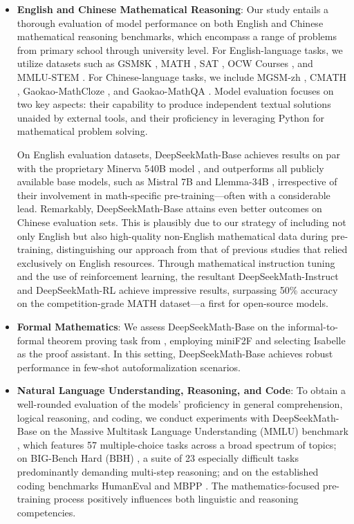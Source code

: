 \begin{itemize}[topsep=0pt]
    \item \textbf{English and Chinese Mathematical Reasoning}: Our study entails a thorough evaluation of model performance on both English and Chinese mathematical reasoning benchmarks, which encompass a range of problems from primary school through university level. For English-language tasks, we utilize datasets such as GSM8K \citep{gsm8k}, MATH \citep{MATH}, SAT \citep{llemma}, OCW Courses \citep{minerva}, and MMLU-STEM \citep{mmlu}. For Chinese-language tasks, we include MGSM-zh \citep{mgsm}, CMATH \citep{wei2023cmath}, Gaokao-MathCloze \citep{agieval}, and Gaokao-MathQA \citep{agieval}. Model evaluation focuses on two key aspects: their capability to produce independent textual solutions unaided by external tools, and their proficiency in leveraging Python for mathematical problem solving.

On English evaluation datasets, DeepSeekMath-Base achieves results on par with the proprietary Minerva 540B model \citep{minerva}, and outperforms all publicly available base models, such as Mistral 7B \citep{mistral} and Llemma-34B \citep{llemma}, irrespective of their involvement in math-specific pre-training—often with a considerable lead. Remarkably, DeepSeekMath-Base attains even better outcomes on Chinese evaluation sets. This is plausibly due to our strategy of including not only English but also high-quality non-English mathematical data during pre-training, distinguishing our approach from that of previous studies \citep{minerva,llemma} that relied exclusively on English resources. Through mathematical instruction tuning and the use of reinforcement learning, the resultant DeepSeekMath-Instruct and DeepSeekMath-RL achieve impressive results, surpassing 50\% accuracy on the competition-grade MATH dataset—a first for open-source models.

\item \textbf{Formal Mathematics}: We assess DeepSeekMath-Base on the informal-to-formal theorem proving task from \citep{dsp_proof}, employing miniF2F \citep{minif2f} and selecting Isabelle \citep{isabelle} as the proof assistant. In this setting, DeepSeekMath-Base achieves robust performance in few-shot autoformalization scenarios.
\item \textbf{Natural Language Understanding, Reasoning, and Code}: To obtain a well-rounded evaluation of the models’ proficiency in general comprehension, logical reasoning, and coding, we conduct experiments with DeepSeekMath-Base on the Massive Multitask Language Understanding (MMLU) benchmark \citep{mmlu}, which features 57 multiple-choice tasks across a broad spectrum of topics; on BIG-Bench Hard (BBH) \citep{bbh}, a suite of 23 especially difficult tasks predominantly demanding multi-step reasoning; and on the established coding benchmarks HumanEval \citep{codex} and MBPP \citep{mbpp}. The mathematics-focused pre-training process positively influences both linguistic and reasoning competencies.


\end{itemize}
